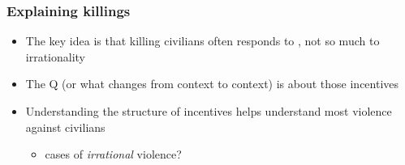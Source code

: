 \documentclass[aspectratio=43]{beamer}
\begin{document}
\begin{frame}
\frametitle{Explaining killings}
\centering

\begin{itemize}
  \item The key idea is that killing civilians often responds to , not so much to irrationality
  \item The Q (or what changes from context to context) is about those incentives
  \item Understanding the structure of incentives helps understand most violence against civilians
  \begin{itemize}
    \item<2-> cases of \textit{irrational} violence?
  \end{itemize}
\end{itemize}

\end{frame}
\end{document}
